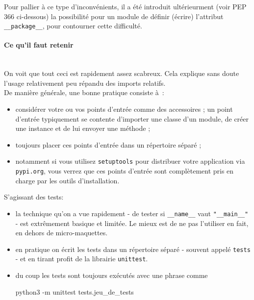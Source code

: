 Pour pallier à ce type d'inconvénients, il a été introduit ultérieurment
(voir PEP 366 ci-dessous) la possibilité pour un module de définir
(écrire) l'attribut \texttt{\_\_package\_\_}, pour contourner cette
difficulté.

    \hypertarget{ce-quil-faut-retenir}{%
\paragraph{Ce qu'il faut retenir\\\\}\label{ce-quil-faut-retenir}}

    On voit que tout ceci est rapidement assez scabreux. Cela explique sans
doute l'usage relativement peu répandu des imports relatifs.\\

De manière générale, une bonne pratique consiste à~:

\begin{itemize}
\tightlist
\item
  considérer votre ou vos points d'entrée comme des accessoires ; un
  point d'entrée typiquement se contente d'importer une classe d'un
  module, de créer une instance et de lui envoyer une méthode ;
\item
  toujours placer ces points d'entrée dans un répertoire séparé ;
\item
  notamment si vous utilisez \texttt{setuptools} pour distribuer votre
  application via \texttt{pypi.org}, vous verrez que ces points d'entrée
  sont complètement pris en charge par les outils d'installation.
\end{itemize}

S'agissant des tests:

\begin{itemize}
\item
  la technique qu'on a vue rapidement - de tester si
  \texttt{\_\_name\_\_} vaut \texttt{"\_\_main\_\_"} - est extrêmement
  basique et limitée. Le mieux est de ne pas l'utiliser en fait, en
  dehors de micro-maquettes.
\item
  en pratique on écrit les tests dans un répertoire séparé - souvent
  appelé \texttt{tests} - et en tirant profit de la librairie
  \texttt{unittest}.
\item
  du coup les tests sont toujours exécutés avec une phrase comme

  python3 -m unittest tests.jeu\_de\_tests
\end{itemize}

